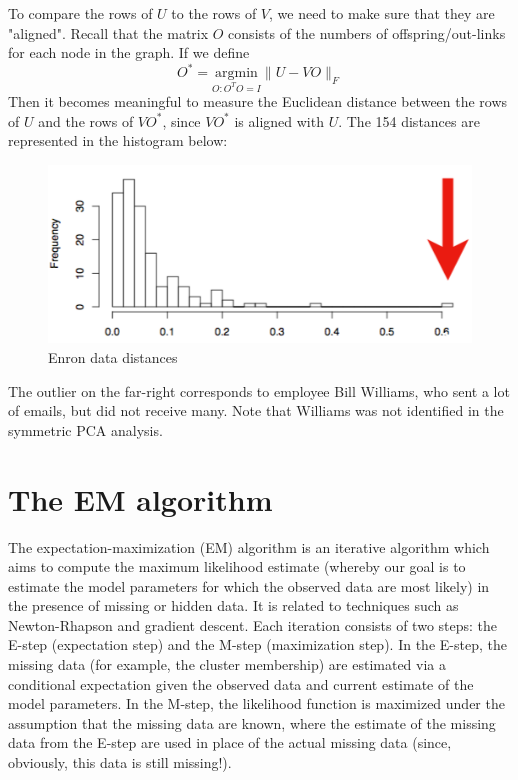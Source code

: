 To compare the rows of $U$ to the rows of $V$, we need to make sure that they are "aligned". Recall that the matrix $O$ consists of the numbers of offspring/out-links for each node in the graph. If we define
$$O^* = \underset{O : O^TO = I}{\text{argmin}} \|U - VO\|_F$$
Then it becomes meaningful to measure the Euclidean distance between the rows of $U$ and the rows of $VO^*$, since $VO^*$ is aligned with $U$. The 154 distances are represented in the histogram below:



\begin{figure}[H]
\begin{center}
\includegraphics[scale=0.4]{dist.png}
\end{center}
\caption{Enron data distances}
\label{fig:dist}
\end{figure}


The outlier on the far-right corresponds to employee Bill Williams, who sent a lot of emails, but did not receive many. Note that Williams was not identified in the symmetric PCA analysis.

\section{The EM algorithm}

The expectation-maximization (EM) algorithm is an iterative algorithm which aims to compute the maximum likelihood estimate (whereby our goal is to estimate the model parameters for which the observed data are most likely) in the presence of missing or hidden data. It is related to techniques such as Newton-Rhapson and gradient descent. Each iteration consists of two steps: the E-step (expectation step) and the M-step (maximization step). In the E-step, the missing data (for example, the cluster membership) are estimated via a conditional expectation given the observed data and current estimate of the model parameters. In the M-step, the likelihood function is maximized under the assumption that the missing data are known, where the estimate of the missing data from the E-step are used in place of the actual missing data (since, obviously, this data is still missing!).

